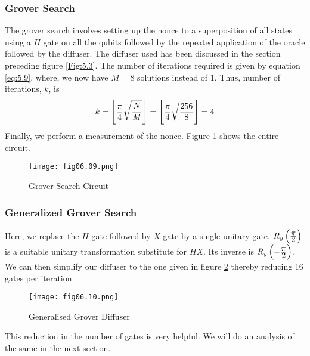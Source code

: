 \subsubsection*{Grover Search}
The grover search involves setting up the nonce to a superposition of all states using a $H$ gate on all the qubits followed by the repeated application of the oracle followed by the diffuser. The diffuser used has been discussed in the section preceding figure \ref{Fig:5.3}. The number of iterations required is given by equation \ref{eq:5.9}, where, we now have $M=8$ solutions instead of $1$. Thus, number of iterations, $k$, is
\begin{equation}
\label{eq:6.1}
k=\left\lfloor\frac{\displaystyle \pi}{\displaystyle 4}\sqrt{\frac{\displaystyle N}{\displaystyle M}}\right\rfloor=\left\lfloor\frac{\displaystyle \pi}{\displaystyle 4}\sqrt{\frac{\displaystyle 256}{\displaystyle 8}}\right\rfloor=4
\end{equation}
Finally, we perform a measurement of the nonce. Figure \ref{Fig:6.9} shows the entire circuit.
\begin{figure}[!htb]
   \begin{minipage}{\textwidth}
     \centering
     \texttt{[image: fig06.09.png]}
     \caption{Grover Search Circuit}
     \label{Fig:6.9}
   \end{minipage}
\end{figure}

\subsubsection*{Generalized Grover Search}
Here, we replace the $H$ gate followed by $X$ gate by a single unitary gate. $R_y\left(\frac{\displaystyle \pi}{\displaystyle 2}\right)$ is a suitable unitary transformation substitute for $HX$. Its inverse is $R_y\left(-\frac{\displaystyle \pi}{\displaystyle 2}\right)$. We can then simplify our diffuser to the one given in figure \ref{Fig:6.10} thereby reducing 16 gates per iteration.
\begin{figure}[!htb]
   \begin{minipage}{\textwidth}
     \centering
     \texttt{[image: fig06.10.png]}
     \caption{Generalised Grover Diffuser}
     \label{Fig:6.10}
   \end{minipage}
\end{figure}
This reduction in the number of gates is very helpful. We will do an analysis of the same in the next section.

